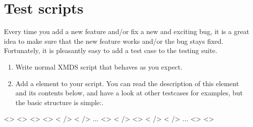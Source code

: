 \documentclass[letterpaper,10pt,english]{sphinxmanual}
\begin{document}
\section{Test scripts}
\label{\detokenize{developer:test-scripts}}\label{\detokenize{developer:testscripts}}\label{\detokenize{developer:index-1}}
\sphinxAtStartPar
Every time you add a new feature and/or fix a new and exciting bug, it is a great idea to make sure that the new feature works and/or the bug stays fixed.  Fortunately, it is pleasantly easy to add a test case to the testing suite.
\begin{enumerate}
%
\item {} 
\sphinxAtStartPar
Write normal XMDS script that behaves as you expect.

\item {} 
\sphinxAtStartPar
Add a  element to your script.  You can read the description of this element and its contents below, and have a look at other testcases for examples, but the basic structure is simple:.

\end{enumerate}
\begin{sphinxalltt}
\textless{}{\hyperref[\detokenize{developer:testingelement}]{}}\textgreater{}
  \textless{}{\hyperref[\detokenize{developer:commandlineelement}]{}}\textgreater{} \textless{}{\hyperref[\detokenize{developer:commandlineelement}]{}}\textgreater{}
  \textless{}{\hyperref[\detokenize{reference_elements:argumentselement}]{}}\textgreater{}
    \textless{}{\hyperref[\detokenize{reference_elements:argumentelement}]{}} /\textgreater{}
    \textless{}{\hyperref[\detokenize{reference_elements:argumentelement}]{}} /\textgreater{}
    ...
  \textless{}{\hyperref[\detokenize{reference_elements:argumentselement}]{}}\textgreater{}
  \textless{}{\hyperref[\detokenize{developer:inputxsilfileelement}]{}} /\textgreater{}
  \textless{}{\hyperref[\detokenize{developer:xsilfileelement}]{}}\textgreater{}
    \textless{}{\hyperref[\detokenize{developer:momentgroupelement}]{}} /\textgreater{}
    \textless{}{\hyperref[\detokenize{developer:momentgroupelement}]{}} /\textgreater{}
    ...
  \textless{}{\hyperref[\detokenize{developer:xsilfileelement}]{}}\textgreater{}
\textless{}{\hyperref[\detokenize{developer:testingelement}]{}}\textgreater{}
\end{sphinxalltt}
\end{document}

